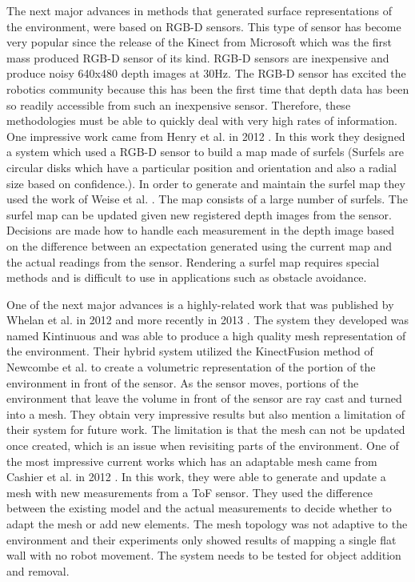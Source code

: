 The next major advances in methods that generated surface representations of the
environment, were based on RGB-D sensors. This type of sensor has become very
popular since the release of the Kinect from Microsoft which was the first mass
produced RGB-D sensor of its kind. RGB-D sensors are inexpensive and produce
noisy 640x480 depth images at 30Hz. The RGB-D sensor has excited the robotics
community because this has been the first time that depth data has been so
readily accessible from such an inexpensive sensor. Therefore, these
methodologies must be able to quickly deal with very high rates of information.
One impressive work came from Henry et al. in 2012 \cite{Henry2012}. In this
work they designed a system which used a RGB-D sensor to build a map made of
surfels (Surfels are circular disks which have a particular position and
orientation and also a radial size based on confidence.). In order to generate
and maintain the surfel map they used the work of Weise et al. \cite{Weise2009}.
The map consists of a large number of surfels. The surfel map can be updated
given new registered depth images from the sensor. Decisions are made how to
handle each measurement in the depth image based on the difference between an
expectation generated using the current map and the actual readings from the
sensor. Rendering a surfel map requires special methods \cite{Pfister2000} and
is difficult to use in applications such as obstacle avoidance.

One of the next major advances is a highly-related work that was published by
Whelan et al. in 2012 \cite{Whelan2012} and more recently in 2013
\cite{Whelan12tr}. The system they developed was named Kintinuous and was able
to produce a high quality mesh representation of the environment. Their hybrid
system utilized the KinectFusion method \cite{Newcombe2011a} of Newcombe et al.
to create a volumetric representation of the portion of the environment in front
of the sensor. As the sensor moves, portions of the environment that leave the
volume in front of the sensor are ray cast and turned into a mesh. They obtain
very impressive results but also mention a limitation of their system for future
work. The limitation is that the mesh can not be updated once created, which is
an issue when revisiting parts of the environment. One of the most impressive
current works which has an adaptable mesh came from Cashier et al. in 2012
\cite{Cahier2012}. In this work, they were able to generate and update a mesh
with new measurements from a ToF sensor. They used the difference between the
existing model and the actual measurements to decide whether to adapt the mesh
or add new elements. The mesh topology was not adaptive to the environment and
their experiments only showed results of mapping a single flat wall with no
robot movement. The system needs to be tested for object addition and removal.

